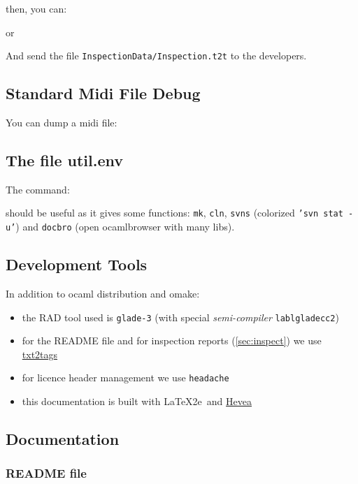 
then, you can:


or


And send the file \texttt{InspectionData/Inspection.t2t} to the developers.

\subsection{Standard Midi File Debug}
You can dump a midi file:


\subsection{The file util.env}
The command:


should be useful as it gives some functions:
\texttt{mk}, \texttt{cln}, \texttt{svns} (colorized \texttt{'svn stat -u'}) and
\texttt{docbro} (open ocamlbrowser with many libs).

\subsection{Development Tools}
In addition to ocaml distribution and omake:

\begin{itemize}
  \item the RAD tool used is \texttt{glade-3} (with special
  \textit{semi-compiler} \texttt{lablgladecc2})
  \item for the README file and for inspection reports (\ref{sec:inspect}) we
  use \href{http://txt2tags.sourceforge.net/}{txt2tags}
  \item for licence header management we use \texttt{headache}
  \item this documentation is built with \LaTeX2e\ and 
  \href{http://hevea.inria.fr/}{Hevea}
\end{itemize}

\subsection{Documentation}

\subsubsection{README file}

